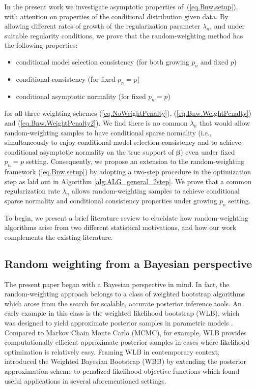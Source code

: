 \documentclass[ejs,authoryear,linksfromyear]{imsart}
\numberwithin{equation}{section}
\theoremstyle{plain}
\begin{document}
In the present work we investigate  asymptotic properties of~(\ref{eq.Bnw.setup}), with attention on properties of
the conditional distribution given data.  By allowing different rates of growth of the regularization parameter $\lambda_n$, and under suitable regularity conditions, we prove that the random-weighting method has the following properties:
\begin{itemize}
	\item conditional model selection consistency (for both growing $p_n$ and fixed $p$)
	\item conditional consistency (for fixed $p_n = p$)
	\item conditional asymptotic normality (for fixed $p_n = p$)
\end{itemize}
for all three weighting schemes (\ref{eq.NoWeightPenalty}), (\ref{eq.Bnw.WeightPenalty}) and (\ref{eq.Bnw.WeightPenalty2}). We find there is no common $\lambda_n$ that would allow random-weighting samples to have conditional sparse normality (i.e., simultaneously to enjoy conditional model selection consistency and to achieve conditional asymptotic normality on the true support of $\bm{\beta}$) even under fixed $p_n = p$ setting. Consequently, we propose an extension to the random-weighting framework (\ref{eq.Bnw.setup}) by adopting a two-step procedure in the optimization step as laid out in Algorithm \ref{alg:ALG_general_2step}. We  prove that a common
regularization rate $\lambda_n$ allows random-weighting samples to achieve conditional sparse normality and conditional consistency properties under growing $p_n$ setting.   

To begin, we present a brief literature review to elucidate how  random-weighting algorithms arise from two different statistical motivations, and how our work complements the existing literature. 

\subsection{Random weighting from a Bayesian perspective}

The present paper 
began with a Bayesian perspective in mind. In fact, the random-weighting approach belongs to a class of weighted bootstrap algorithms which arose from the search for scalable, accurate posterior inference tools. An early example in this class is the weighted likelihood bootstrap (WLB), which was designed to yield approximate posterior samples in parametric models \citep{Newton&Raftery}. Compared to Markov Chain Monte Carlo (MCMC), for example, WLB provides computationally efficient approximate posterior samples in cases where likelihood optimization is relatively easy. Framing WLB in contemporary context, \citet{WBB} introduced the Weighted Bayesian Bootstrap (WBB) by extending the posterior approximation scheme to penalized likelihood objective functions which found useful applications in several aforementioned settings. 
\end{document}
